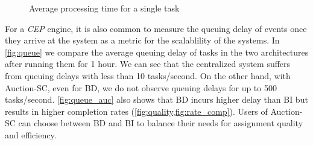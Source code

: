 \begin{figure}[h]
    \centering
       \vspace{-0.15in}
    \caption{Average processing time for a single task}
    \label{fig:runtime}
\end{figure}

For a \emph{CEP} engine, it is also common to measure the queuing delay of events \cite{Wu06} once they arrive at the system as a metric for the scalablility of the systems. In \cref{fig:queue} we compare the average queuing delay of tasks in the two architectures after running them for 1 hour. We can see that the centralized system suffers from queuing delays with less than 10 tasks/second. On the other hand, with Auction-SC, even for BD, we do not observe queuing delays for up to 500 tasks/second. \cref{fig:queue_auc} also shows that BD incurs higher delay than BI but results in higher completion rates (\cref{fig:quality,fig:rate_comp}). Users of Auction-SC can choose between BD and BI to balance their needs for assignment quality and efficiency.

